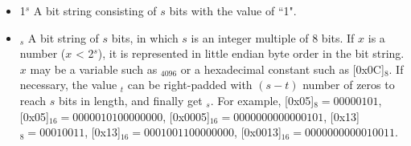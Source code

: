 \documentclass[main\_\_EN.tex]{subfiles}
\begin{document}
\begin{itemize}
\item 
1\begin{math}^s\end{math} 
\hspace{0.75cm} 
A bit string consisting of \begin{math}s\end{math} bits with the value of ``1".

\item
    \begin{math}[x]_{s}\end{math}  \hspace{0.5cm}
       A bit string of \begin{math}s\end{math} bits, in which \begin{math}s\end{math} is an integer multiple of 8 bits. If \begin{math}x\end{math} is a number (\begin{math}x\end{math} < 2\begin{math}^s\end{math}), it is represented in little endian byte order in the bit string. \begin{math}x\end{math} may be a variable such as \begin{math}[Y]_{4096}\end{math} or a hexadecimal constant such as [0x0C]\begin{math}_{8}\end{math}. If necessary, the value \begin{math}[x]_{t}\end{math} can be right-padded with \begin{math} (s-t) \end{math} number of zeros to reach \begin{math}s\end{math} bits in length, and finally get \begin{math}[x]_{s}\end{math}. For example, [0x05]\begin{math}_{8} = 00000101\end{math}, 
       [0x05]\begin{math}_{16} = 00000101 00000000\end{math}, 
       [0x0005]\begin{math}_{16} = 00000000 00000101\end{math}, 
       [0x13]\begin{math}_{8} = 00010011\end{math}, 
       [0x13]\begin{math}_{16} = 00010011 00000000\end{math}, 
       [0x0013]\begin{math}_{16} = 00000000 00010011\end{math}.


\end{itemize}
\end{document}
